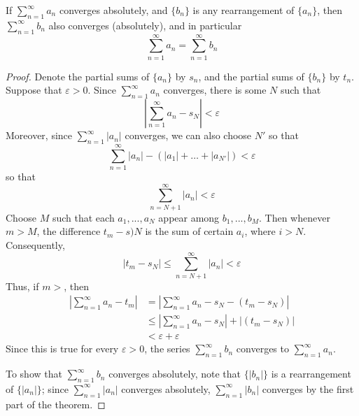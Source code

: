 \documentclass[12pt, a4paper, oneside, openright, titlepage]{book}
\begin{document}
\begin{thm}
    If $\sum\limits_{n=1}^{\infty}a_n$ converges absolutely, and $\{b_n\}$ is any rearrangement of $\{a_n\}$, then $\sum\limits_{n=1}^{\infty}b_n$ also converges (absolutely), and in particular \begin{equation*}
        \sum\limits_{n=1}^{\infty}a_n = \sum\limits_{n=1}^{\infty}b_n
    \end{equation*}
\end{thm}
\begin{proof}
    Denote the partial sums of $\{a_n\}$ by $s_n$, and the partial sums of $\{b_n\}$ by $t_n$. Suppose that $\varepsilon > 0$. Since $\sum\limits_{n=1}^{\infty}a_n$ converges, there is some $N$ such that \begin{equation*}
        \left|\sum\limits_{n=1}^{\infty}a_n - s_N\right| < \varepsilon
    \end{equation*}
    Moreover, since $\sum\limits_{n=1}^{\infty}|a_n|$ converges, we can also choose $N'$ so that \begin{equation*}
        \sum\limits_{n=1}^{\infty}|a_n| - (|a_1|+\hdots + |a_{N'}|) < \varepsilon
    \end{equation*}
    so that \begin{equation*}
        \sum\limits_{n=N+1}^{\infty}|a_n| < \varepsilon
    \end{equation*}
    Choose $M$ such that each $a_1,...,a_N$ appear among $b_1,...,b_M$. Then whenever $m > M$, the difference $t_m - s)N$ is the sum of certain $a_i$, where $i > N$. Consequently, \begin{equation*}
        |t_m-s_N| \leq \sum\limits_{n=N+1}^{\infty}|a_n| < \varepsilon
    \end{equation*}
    Thus, if $m > $, then \begin{align*}
        \left|\sum\limits_{n=1}^{\infty}a_n - t_m \right|&= \left|\sum\limits_{n=1}^{\infty}a_n - s_N - (t_m-s_N)\right| \\
        &\leq \left|\sum\limits_{n=1}^{\infty}a_n - s_N\right| +|(t_m-s_N)| \\
        &< \varepsilon + \varepsilon
    \end{align*}
    Since this is true for every $\varepsilon > 0$, the series $\sum\limits_{n=1}^{\infty}b_n$ converges to $\sum\limits_{n=1}^{\infty}a_n$.

    To show that $\sum\limits_{n=1}^{\infty}b_n$ converges absolutely, note that $\{|b_n|\}$ is a rearrangement of $\{|a_n|\}$; since $\sum\limits_{n=1}^{\infty}|a_n|$ converges absolutely, $\sum\limits_{n=1}^{\infty}|b_n|$ converges by the first part of the theorem.
\end{proof}
\end{document}
